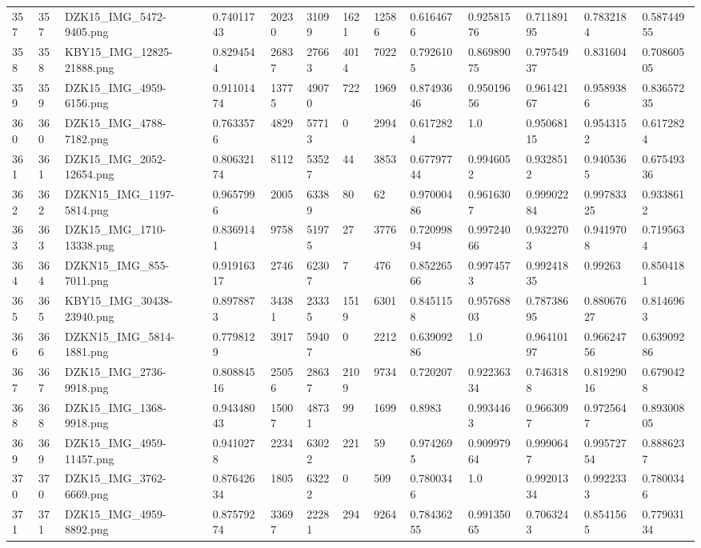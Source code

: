 \documentclass[11pt, a4paper, twoside]{report}
\begin{document}
\begin{longtable}[c]{@{}lllllllllllll@{}}
357 & 357 & DZK15\_IMG\_5472-9405.png & 0.74011743 & 20230 & 31099 & 1621 & 12586 & 0.6164676 & 0.92581576 & 0.71189195 & 0.7832184 & 0.58744955 \\
358 & 358 & KBY15\_IMG\_12825-21888.png & 0.8294544 & 26837 & 27663 & 4014 & 7022 & 0.7926105 & 0.86989075 & 0.79754937 & 0.831604 & 0.70860505 \\
359 & 359 & DZK15\_IMG\_4959-6156.png & 0.91101474 & 13775 & 49070 & 722 & 1969 & 0.87493646 & 0.95019656 & 0.96142167 & 0.9589386 & 0.83657235 \\
360 & 360 & DZK15\_IMG\_4788-7182.png & 0.7633576 & 4829 & 57713 & 0 & 2994 & 0.6172824 & 1.0 & 0.95068115 & 0.9543152 & 0.6172824 \\
361 & 361 & DZK15\_IMG\_2052-12654.png & 0.80632174 & 8112 & 53527 & 44 & 3853 & 0.67797744 & 0.9946052 & 0.9328512 & 0.9405365 & 0.67549336 \\
362 & 362 & DZKN15\_IMG\_1197-5814.png & 0.9657996 & 2005 & 63389 & 80 & 62 & 0.97000486 & 0.9616307 & 0.99902284 & 0.99783325 & 0.9338612 \\
363 & 363 & DZK15\_IMG\_1710-13338.png & 0.8369141 & 9758 & 51975 & 27 & 3776 & 0.72099894 & 0.99724066 & 0.9322703 & 0.9419708 & 0.7195634 \\
364 & 364 & DZKN15\_IMG\_855-7011.png & 0.91916317 & 2746 & 62307 & 7 & 476 & 0.85226566 & 0.9974573 & 0.99241835 & 0.99263 & 0.8504181 \\
365 & 365 & KBY15\_IMG\_30438-23940.png & 0.8978873 & 34381 & 23335 & 1519 & 6301 & 0.8451158 & 0.95768803 & 0.78738695 & 0.88067627 & 0.8146963 \\
366 & 366 & DZKN15\_IMG\_5814-1881.png & 0.7798129 & 3917 & 59407 & 0 & 2212 & 0.63909286 & 1.0 & 0.96410197 & 0.96624756 & 0.63909286 \\
367 & 367 & DZK15\_IMG\_2736-9918.png & 0.80884516 & 25056 & 28637 & 2109 & 9734 & 0.720207 & 0.92236334 & 0.7463188 & 0.81929016 & 0.6790428 \\
368 & 368 & DZK15\_IMG\_1368-9918.png & 0.94348043 & 15007 & 48731 & 99 & 1699 & 0.8983 & 0.9934463 & 0.9663097 & 0.9725647 & 0.89300805 \\
369 & 369 & DZK15\_IMG\_4959-11457.png & 0.9410278 & 2234 & 63022 & 221 & 59 & 0.9742695 & 0.90997964 & 0.9990647 & 0.99572754 & 0.8886237 \\
370 & 370 & DZK15\_IMG\_3762-6669.png & 0.87642634 & 1805 & 63222 & 0 & 509 & 0.7800346 & 1.0 & 0.99201334 & 0.9922333 & 0.7800346 \\
371 & 371 & DZK15\_IMG\_4959-8892.png & 0.87579274 & 33697 & 22281 & 294 & 9264 & 0.78436255 & 0.99135065 & 0.7063243 & 0.8541565 & 0.77903134 \\

\end{longtable}
\end{document}
